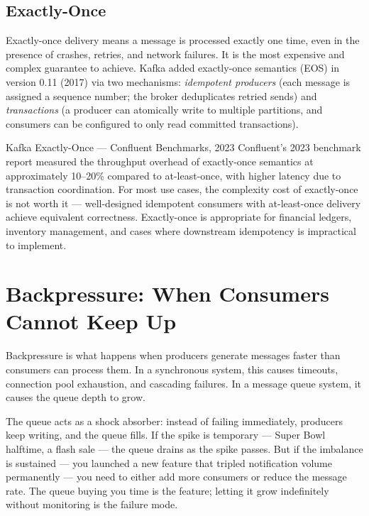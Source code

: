\documentclass[11pt,a4paper]{article}
\begin{document}
\subsection{Exactly-Once}

Exactly-once delivery means a message is processed exactly one time, even in the presence of crashes, retries, and network failures. It is the most expensive and complex guarantee to achieve. Kafka added exactly-once semantics (EOS) in version 0.11 (2017) via two mechanisms: \textit{idempotent producers} (each message is assigned a sequence number; the broker deduplicates retried sends) and \textit{transactions} (a producer can atomically write to multiple partitions, and consumers can be configured to only read committed transactions).

\begin{industrybox}{Kafka Exactly-Once --- Confluent Benchmarks, 2023}
Confluent's 2023 benchmark report measured the throughput overhead of exactly-once semantics at approximately 10--20\% compared to at-least-once, with higher latency due to transaction coordination. For most use cases, the complexity cost of exactly-once is not worth it --- well-designed idempotent consumers with at-least-once delivery achieve equivalent correctness. Exactly-once is appropriate for financial ledgers, inventory management, and cases where downstream idempotency is impractical to implement.
\end{industrybox}

\section{Backpressure: When Consumers Cannot Keep Up}

Backpressure is what happens when producers generate messages faster than consumers can process them. In a synchronous system, this causes timeouts, connection pool exhaustion, and cascading failures. In a message queue system, it causes the queue depth to grow.

The queue acts as a shock absorber: instead of failing immediately, producers keep writing, and the queue fills. If the spike is temporary --- Super Bowl halftime, a flash sale --- the queue drains as the spike passes. But if the imbalance is sustained --- you launched a new feature that tripled notification volume permanently --- you need to either add more consumers or reduce the message rate. The queue buying you time is the feature; letting it grow indefinitely without monitoring is the failure mode.
\end{document}
